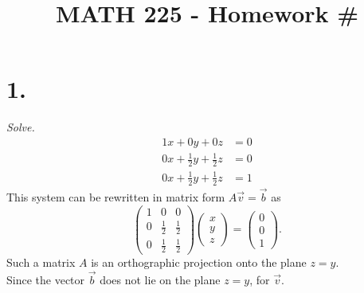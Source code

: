 \documentclass[12pt]{article}
\title{\vspace{-4\baselineskip}MATH 225 - Homework \#\HOMEWORKNUM}
\author{\NAME}
\date{\DATE}
\begin{document}
\maketitle

\section*{1.}
\textit{Solve.}
\begin{align*}
	1x + 0y + 0z &= 0 \\
	0x + \frac{1}{2}y + \frac{1}{2}z &= 0 \\
	0x + \frac{1}{2}y + \frac{1}{2}z &= 1
\end{align*}
This system can be rewritten in matrix form $A\vec{v} = \vec{b}$ as
\begin{equation*}
	\begin{pmatrix}
		1 & 0 & 0 \\
		0 & \frac{1}{2} & \frac{1}{2} \\
		0 & \frac{1}{2} & \frac{1}{2}
	\end{pmatrix}
	\begin{pmatrix}
		x \\
		y \\
		z
	\end{pmatrix}
	=
	\begin{pmatrix}
		0 \\
		0 \\
		1
	\end{pmatrix}
	.
\end{equation*}
Such a matrix $A$ is an orthographic projection onto the plane $z = y$. \\
Since the vector $\vec{b}$ does not lie on the plane $z = y$,
for $\vec{v}$.
\end{document}
